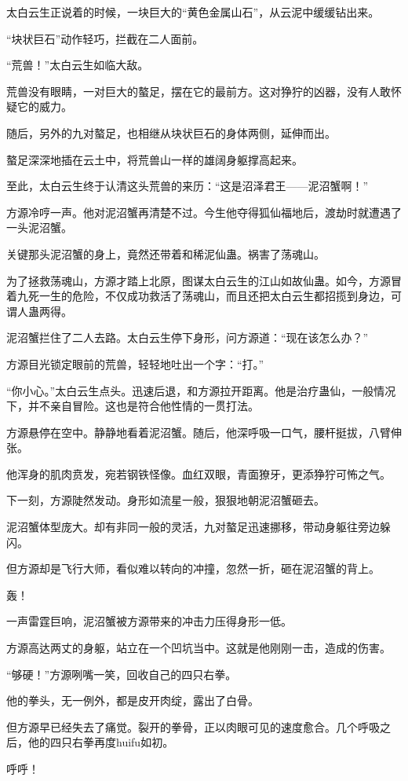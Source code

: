 \begin{this_body}
太白云生正说着的时候，一块巨大的“黄色金属山石”，从云泥中缓缓钻出来。

“块状巨石”动作轻巧，拦截在二人面前。

“荒兽！”太白云生如临大敌。

荒兽没有眼睛，一对巨大的螯足，摆在它的最前方。这对狰狞的凶器，没有人敢怀疑它的威力。

随后，另外的九对螯足，也相继从块状巨石的身体两侧，延伸而出。

螯足深深地插在云土中，将荒兽山一样的雄阔身躯撑高起来。

至此，太白云生终于认清这头荒兽的来历：“这是沼泽君王——泥沼蟹啊！”

方源冷哼一声。他对泥沼蟹再清楚不过。今生他夺得狐仙福地后，渡劫时就遭遇了一头泥沼蟹。

关键那头泥沼蟹的身上，竟然还带着和稀泥仙蛊。祸害了荡魂山。

为了拯救荡魂山，方源才踏上北原，图谋太白云生的江山如故仙蛊。如今，方源冒着九死一生的危险，不仅成功救活了荡魂山，而且还把太白云生都招揽到身边，可谓人蛊两得。

泥沼蟹拦住了二人去路。太白云生停下身形，问方源道：“现在该怎么办？”

方源目光锁定眼前的荒兽，轻轻地吐出一个字：“打。”

“你小心。”太白云生点头。迅速后退，和方源拉开距离。他是治疗蛊仙，一般情况下，并不亲自冒险。这也是符合他性情的一贯打法。

方源悬停在空中。静静地看着泥沼蟹。随后，他深呼吸一口气，腰杆挺拔，八臂伸张。

他浑身的肌肉贲发，宛若钢铁怪像。血红双眼，青面獠牙，更添狰狞可怖之气。

下一刻，方源陡然发动。身形如流星一般，狠狠地朝泥沼蟹砸去。

泥沼蟹体型庞大。却有非同一般的灵活，九对螯足迅速挪移，带动身躯往旁边躲闪。

但方源却是飞行大师，看似难以转向的冲撞，忽然一折，砸在泥沼蟹的背上。

轰！

一声雷霆巨响，泥沼蟹被方源带来的冲击力压得身形一低。

方源高达两丈的身躯，站立在一个凹坑当中。这就是他刚刚一击，造成的伤害。

“够硬！”方源咧嘴一笑，回收自己的四只右拳。

他的拳头，无一例外，都是皮开肉绽，露出了白骨。

但方源早已经失去了痛觉。裂开的拳骨，正以肉眼可见的速度愈合。几个呼吸之后，他的四只右拳再度huifu如初。

呼呼！


\end{this_body}
